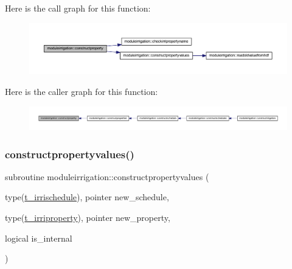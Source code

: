 Here is the call graph for this function\+:\nopagebreak
\begin{figure}[H]
\begin{center}
\leavevmode
\includegraphics[width=350pt]{namespacemoduleirrigation_a777c0e9f94d23db57aa011c352cc06d9_cgraph}
\end{center}
\end{figure}
Here is the caller graph for this function\+:\nopagebreak
\begin{figure}[H]
\begin{center}
\leavevmode
\includegraphics[width=350pt]{namespacemoduleirrigation_a777c0e9f94d23db57aa011c352cc06d9_icgraph}
\end{center}
\end{figure}
\mbox{\label{namespacemoduleirrigation_afc426b9dbadbb0d592b750d75f2bedfc}} 
\subsubsection{\texorpdfstring{constructpropertyvalues()}{constructpropertyvalues()}}
{\footnotesize\ttfamily subroutine moduleirrigation\+::constructpropertyvalues (\begin{DoxyParamCaption}\item[{type(\mbox{\hyperlink{structmoduleirrigation_1_1t__irrischedule}{t\+\_\+irrischedule}}), pointer}]{new\+\_\+schedule,  }\item[{type(\mbox{\hyperlink{structmoduleirrigation_1_1t__irriproperty}{t\+\_\+irriproperty}}), pointer}]{new\+\_\+property,  }\item[{logical}]{is\+\_\+internal }\end{DoxyParamCaption})\hspace{0.3cm}{\ttfamily [private]}}

